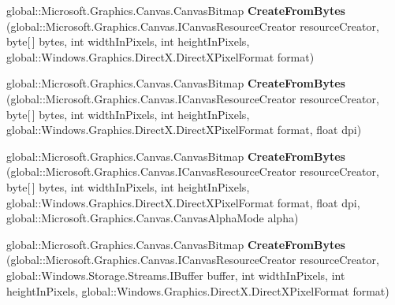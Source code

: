 \begin{DoxyCompactItemize}
\item 
\mbox{\label{interface_microsoft_1_1_graphics_1_1_canvas_1_1_i_canvas_bitmap_statics_a178d2b6c57c3a8d10e232d4adf9ffaa9}} 
global\+::\+Microsoft.\+Graphics.\+Canvas.\+Canvas\+Bitmap {\bfseries Create\+From\+Bytes} (global\+::\+Microsoft.\+Graphics.\+Canvas.\+I\+Canvas\+Resource\+Creator resource\+Creator, byte\mbox{[}$\,$\mbox{]} bytes, int width\+In\+Pixels, int height\+In\+Pixels, global\+::\+Windows.\+Graphics.\+Direct\+X.\+Direct\+X\+Pixel\+Format format)
\item 
\mbox{\label{interface_microsoft_1_1_graphics_1_1_canvas_1_1_i_canvas_bitmap_statics_a15c9cb7a6a4fa9094026177411c688f7}} 
global\+::\+Microsoft.\+Graphics.\+Canvas.\+Canvas\+Bitmap {\bfseries Create\+From\+Bytes} (global\+::\+Microsoft.\+Graphics.\+Canvas.\+I\+Canvas\+Resource\+Creator resource\+Creator, byte\mbox{[}$\,$\mbox{]} bytes, int width\+In\+Pixels, int height\+In\+Pixels, global\+::\+Windows.\+Graphics.\+Direct\+X.\+Direct\+X\+Pixel\+Format format, float dpi)
\item 
\mbox{\label{interface_microsoft_1_1_graphics_1_1_canvas_1_1_i_canvas_bitmap_statics_ada08417cd378d32815604fe3ea8fb18d}} 
global\+::\+Microsoft.\+Graphics.\+Canvas.\+Canvas\+Bitmap {\bfseries Create\+From\+Bytes} (global\+::\+Microsoft.\+Graphics.\+Canvas.\+I\+Canvas\+Resource\+Creator resource\+Creator, byte\mbox{[}$\,$\mbox{]} bytes, int width\+In\+Pixels, int height\+In\+Pixels, global\+::\+Windows.\+Graphics.\+Direct\+X.\+Direct\+X\+Pixel\+Format format, float dpi, global\+::\+Microsoft.\+Graphics.\+Canvas.\+Canvas\+Alpha\+Mode alpha)
\item 
\mbox{\label{interface_microsoft_1_1_graphics_1_1_canvas_1_1_i_canvas_bitmap_statics_aa8f2efb8e918d69408efa286ced198cd}} 
global\+::\+Microsoft.\+Graphics.\+Canvas.\+Canvas\+Bitmap {\bfseries Create\+From\+Bytes} (global\+::\+Microsoft.\+Graphics.\+Canvas.\+I\+Canvas\+Resource\+Creator resource\+Creator, global\+::\+Windows.\+Storage.\+Streams.\+I\+Buffer buffer, int width\+In\+Pixels, int height\+In\+Pixels, global\+::\+Windows.\+Graphics.\+Direct\+X.\+Direct\+X\+Pixel\+Format format)

\end{DoxyCompactItemize}
